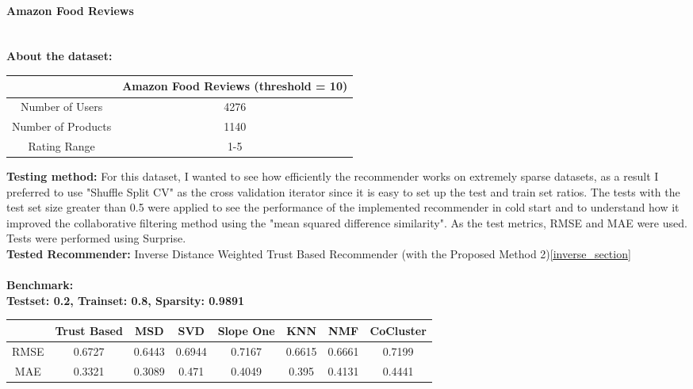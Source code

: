 	\paragraph{Amazon Food Reviews \cite{Amazonfoodreviews}} \mbox{}\\
	\textbf{About the dataset:} 
	\begin{center}
		\begin{tabular}{ | c | c |}
			\hline
			&Amazon Food Reviews (threshold = 10)  \\  
			\hline
			Number of Users & 4276 \\
			\hline
			Number of Products & 1140 \\
			\hline
			Rating Range & 1-5 \\
			\hline
		\end{tabular}
	\end{center} 
	\vspace{0.5cm}
	\textbf{Testing method:} For this dataset, I wanted to see how efficiently the recommender works on extremely sparse datasets, as a result I preferred to use "Shuffle Split CV" as the cross validation iterator since it is easy to set up the test and train set ratios. The tests with the test set size greater than 0.5 were applied to see the performance of the implemented recommender in cold start and to understand how it improved the collaborative filtering method using the "mean squared difference similarity". As the test metrics, RMSE and MAE were used. Tests were performed using Surprise.\\
	\textbf{Tested Recommender:} Inverse Distance Weighted Trust Based Recommender (with the Proposed Method 2)\ref{inverse_section} \\ \\
	\textbf{Benchmark:} \\
	\textbf{Testset: 0.2, Trainset: 0.8, Sparsity: 0.9891}
	\begin{center}
		\begin{tabular}{ | c | c | c | c | c | c | c | c |}
			\hline
			& Trust Based & MSD & SVD & Slope One & KNN & NMF & CoCluster\\ 
			\hline
			RMSE&0.6727  & 0.6443  & 0.6944  & 0.7167  & 0.6615  & 0.6661  & 0.7199\\
			\hline
			MAE&0.3321  & 0.3089  & 0.471  & 0.4049  & 0.395  & 0.4131  & 0.4441\\
			\hline
		\end{tabular}
	\end{center} 
	\vspace{1cm}
